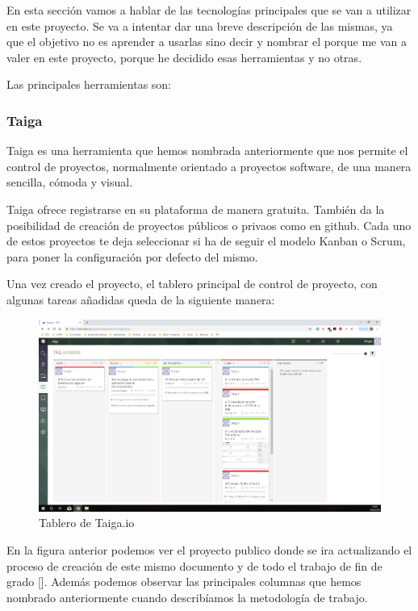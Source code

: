En esta sección vamos a hablar de las tecnologías principales que se van a utilizar en este proyecto. Se va a intentar dar una breve descripción de las mismas, ya que el objetivo no es aprender a usarlas sino decir y nombrar el porque me van a valer en este proyecto, porque he decidido esas herramientas y no otras. 

Las principales herramientas son: 

\subsubsection{Taiga}
Taiga \cite{taiga} es una herramienta que hemos nombrada anteriormente que nos permite el control de proyectos, normalmente orientado a proyectos software, de una manera sencilla, cómoda y visual. 

Taiga ofrece registrarse en su plataforma de manera gratuita. También da la posibilidad de creación de proyectos públicos o privaos como en github. Cada uno de estos proyectos te deja seleccionar si ha de seguir el modelo Kanban o Scrum, para poner la configuración por defecto del mismo. 

Una vez creado el proyecto, el tablero principal de control de proyecto, con algunas tareas añadidas queda de la siguiente manera:

\begin{figure}[H]
    \centering
    \includegraphics[scale=0.3]{imagenes/introduccion/taiga.png}
    \caption{Tablero de Taiga.io}
    \label{fig:tableroTaiga}
\end{figure}

En la figura anterior podemos ver el proyecto publico donde se ira actualizando el proceso de creación de este mismo documento y de todo el trabajo de fin de grado []. Además podemos observar las principales columnas que hemos nombrado anteriormente cuando describíamos la metodología de trabajo. 

